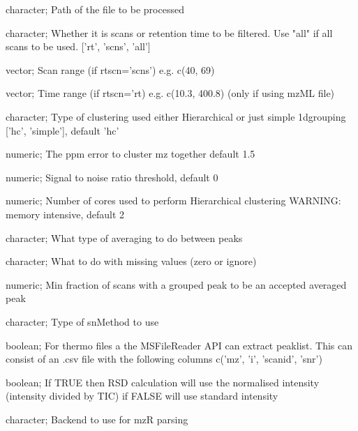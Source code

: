 \documentclass[letterpaper]{book}
\begin{document}
\begin{Arguments}
\begin{ldescription}
\item[\code{filePth}] character; Path of the file to be processed

\item[\code{rtscn}] character; Whether it is scans or retention time to be filtered. Use "all" if all scans to be used. ['rt', 'scns', 'all']

\item[\code{scanRange}] vector; Scan range (if rtscn='scns') e.g. c(40, 69)

\item[\code{timeRange}] vector; Time range (if rtscn='rt) e.g. c(10.3, 400.8) (only if using mzML file)

\item[\code{clustType}] character; Type of clustering used either Hierarchical or just simple 1dgrouping ['hc', 'simple'], default 'hc'

\item[\code{ppm}] numeric; The ppm error to cluster mz together default 1.5

\item[\code{snthr}] numeric; Signal to noise ratio threshold, default 0

\item[\code{cores}] numeric; Number of cores used to perform Hierarchical clustering WARNING: memory intensive, default 2

\item[\code{av}] character; What type of averaging to do between peaks

\item[\code{missingV}] character; What to do with missing values (zero or ignore)

\item[\code{minfrac}] numeric; Min fraction of scans with a grouped peak to be an accepted averaged peak

\item[\code{snMeth}] character; Type of snMethod to use

\item[\code{MSFileReader}] boolean; For thermo files a the MSFileReader API can extract peaklist. This can consist of an .csv file with
the following columns c('mz', 'i', 'scanid', 'snr')

\item[\code{normTIC}] boolean; If TRUE then RSD calculation will use the normalised intensity (intensity divided by TIC) if FALSE will use standard intensity

\item[\code{mzRback}] character; Backend to use for mzR parsing
\end{ldescription}
\end{Arguments}
\end{document}
